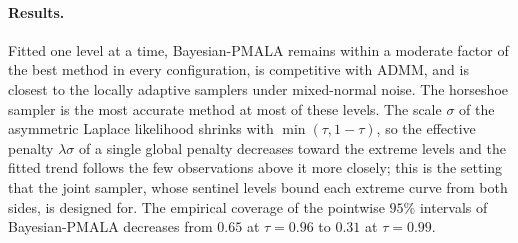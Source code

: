 \paragraph{Results.} Fitted one level at a time, Bayesian-PMALA remains within a moderate factor of the best method in every configuration, is competitive with ADMM, and is closest to the locally adaptive samplers under mixed-normal noise. The horseshoe sampler is the most accurate method at most of these levels. The scale $\sigma$ of the asymmetric Laplace likelihood shrinks with $\min(\tau, 1-\tau)$, so the effective penalty $\lambda\sigma$ of a single global penalty decreases toward the extreme levels and the fitted trend follows the few observations above it more closely; this is the setting that the joint sampler, whose sentinel levels bound each extreme curve from both sides, is designed for. The empirical coverage of the pointwise $95\%$ intervals of Bayesian-PMALA decreases from $0.65$ at $\tau=0.96$ to $0.31$ at $\tau=0.99$.

